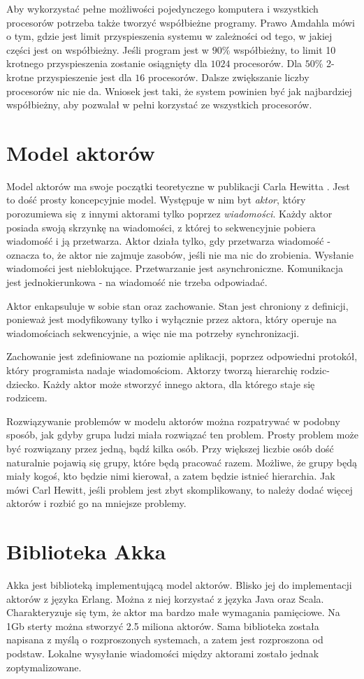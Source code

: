 \documentclass[oneside, 12pt, a4paper]{article}
\begin{document}
\begin{multicols}{2}
Aby wykorzystać pełne możliwości pojedynczego komputera i wszystkich procesorów potrzeba także tworzyć współbieżne programy. Prawo Amdahla mówi o tym, gdzie jest limit przyspieszenia systemu w zależności od tego, w jakiej części jest on współbieżny. Jeśli program jest w $90\%$ współbieżny, to limit 10 krotnego przyspieszenia zostanie osiągnięty dla $1024$ procesorów. Dla $50\%$ 2-krotne przyspieszenie jest dla $16$ procesorów. Dalsze zwiększanie liczby procesorów nic nie da. Wniosek jest taki, że system powinien być jak najbardziej współbieżny, aby pozwalał w pełni korzystać ze wszystkich procesorów.

\section{Model aktorów}
Model aktorów ma swoje początki teoretyczne w publikacji Carla Hewitta \cite{Hewitt:1973vp}. Jest to dość prosty koncepcyjnie model. Występuje w nim byt \emph{aktor}, który porozumiewa się z innymi aktorami tylko poprzez \emph{wiadomości}. Każdy aktor posiada swoją skrzynkę na wiadomości, z której to sekwencyjnie pobiera wiadomość i ją przetwarza. Aktor działa tylko, gdy przetwarza wiadomość - oznacza to, że aktor nie zajmuje zasobów, jeśli nie ma nic do zrobienia. Wysłanie wiadomości jest nieblokujące. Przetwarzanie jest asynchroniczne. Komunikacja jest jednokierunkowa - na wiadomość nie trzeba odpowiadać.

Aktor enkapsuluje w sobie stan oraz zachowanie. Stan jest chroniony z definicji, ponieważ jest modyfikowany tylko i wyłącznie przez aktora, który operuje na wiadomościach sekwencyjnie, a więc nie ma potrzeby synchronizacji.

Zachowanie jest zdefiniowane na poziomie aplikacji, poprzez odpowiedni protokół, który programista nadaje wiadomościom. Aktorzy tworzą hierarchię rodzic-dziecko. Każdy aktor może stworzyć innego aktora, dla którego staje się rodzicem. 

Rozwiązywanie problemów w modelu aktorów można rozpatrywać w podobny sposób, jak gdyby grupa ludzi miała rozwiązać ten problem. Prosty problem może być rozwiązany przez jedną, bądź kilka osób. Przy większej liczbie osób dość naturalnie pojawią się grupy, które będą pracować razem. Możliwe, że grupy będą miały kogoś, kto będzie nimi kierował, a zatem będzie istnieć hierarchia. Jak mówi Carl Hewitt, jeśli problem jest zbyt skomplikowany, to należy dodać więcej aktorów i rozbić go na mniejsze problemy.

\section{Biblioteka Akka}
Akka jest biblioteką implementującą model aktorów. Blisko jej do implementacji aktorów z języka Erlang. Można z niej korzystać z języka Java oraz Scala. Charakteryzuje się tym, że aktor ma bardzo małe wymagania pamięciowe. Na 1Gb sterty można stworzyć 2.5 miliona aktorów. Sama biblioteka została napisana z myślą o rozproszonych systemach, a zatem jest rozproszona od podstaw. Lokalne wysyłanie wiadomości między aktorami zostało jednak zoptymalizowane. 


\end{multicols}
\end{document}
